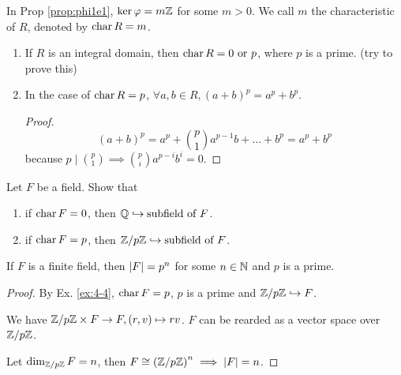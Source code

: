\begin{definition}
  In Prop \ref{prop:phi1e1}, $\operatorname{ker} \varphi = m\mathbb{Z}$ for some $m > 0$.
  We call $m$ the characteristic of $R$, denoted by $\operatorname{char} R = m$.
\end{definition}

\begin{prop} \mbox{}
  \begin{enumerate}
    \item If $R$ is an integral domain, then $\operatorname{char} R = 0 \text{~or~} p$,
      where $p$ is a prime. (try to prove this)
    \item In the case of $\operatorname{char} R = p$,
      $\forall a, b \in R, (a + b)^p = a^p + b^p$.
      \begin{proof}
        \[ (a+b)^p = a^p + \binom{p}{1}a^{p-1}b + \dots + b^p = a^p + b^p \]
        because $p \mid \binom{p}{1} \implies \binom{p}{i}a^{p-i}b^{i} = 0$.
      \end{proof}
  \end{enumerate}
\end{prop}

\begin{exercise}
  Let $F$ be a field. Show that
  \begin{enumerate}
    \item if $\operatorname{char} F = 0$, then $\mathbb{Q} \hookrightarrow \text{subfield of~} F$.
    \item if $\operatorname{char} F = p$, then
      ${\mathbb{Z}}/{p\mathbb{Z}} \hookrightarrow \text{subfield of~} F$.
  \end{enumerate}
  \label{ex:4-4}
\end{exercise}

\begin{theorem}
  If $F$ is a finite field, then $\lvert F\rvert = p^n$ for some $n \in \mathbb{N}$ and
  $p$ is a prime.
  \begin{proof}
    By Ex. \ref{ex:4-4}, $\operatorname{char} F = p$, $p$ is a prime and ${\mathbb{Z}}/{p\mathbb{Z}}
    \hookrightarrow F$.

    We have ${\mathbb{Z}}/{p\mathbb{Z}} \times F \to F, (r, v) \mapsto rv$.
    $F$ can be rearded as a vector space over ${\mathbb{Z}}/{p\mathbb{Z}}$.

    Let $\dim_{{\mathbb{Z}}/{p\mathbb{Z}}} F = n$, then $F \cong
    \left({\mathbb{Z}}/{p\mathbb{Z}}\right)^n \implies \lvert F\rvert = n$.
  \end{proof}
\end{theorem}

